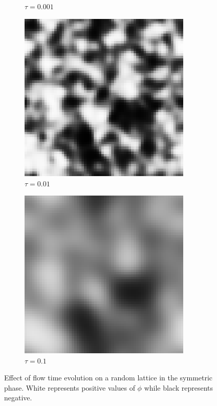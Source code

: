 \begin{figure}[h]
\begin{subfigure}[b]{0.2\textwidth}
        \caption{$\tau=0.001$}
      \end{subfigure}%
      \begin{subfigure}[b]{0.2\textwidth}\centering
        \includegraphics[width=0.9\textwidth]{imgs/gf2.png}
        \caption{$\tau=0.01$}
      \end{subfigure}%
      \begin{subfigure}[b]{0.2\textwidth}\centering
        \includegraphics[width=0.9\textwidth]{imgs/gf3.png}
        \caption{$\tau=0.1$}
      \end{subfigure}%
      \caption{\label{fig:flow} Effect of flow time evolution on a random lattice in the symmetric phase. White represents positive values of $\phi$ while black represents negative.}
\end{figure}

